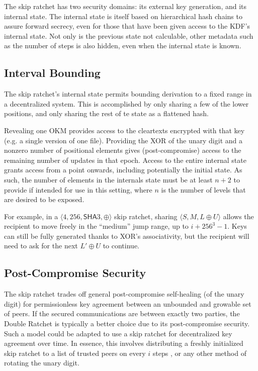 \documentclass[twocolumn]{article}
\begin{document}
	The skip ratchet has two security domains: its external key generation, and its internal state. The internal state is itself based on hierarchical hash chains to assure forward secrecy, even for those that have been given access to the KDF's internal state. Not only is the previous state not calculable, other metadata such as the number of steps is also hidden, even when the internal state is known.
	
	\subsection{Interval Bounding}
	
	The skip ratchet's internal state permits bounding derivation to a fixed range in a decentralized system. This is accomplished by only sharing a few of the lower positions, and only sharing the rest of te state as a flattened hash.
	
	Revealing one OKM provides access to the cleartexts encrypted with that key (e.g. a single version of one file). Providing the \textsf{XOR} of the unary digit and a nonzero number of positional elements gives (post-compromise) access to the remaining number of updates in that epoch. Access to the entire internal state grants access from a point onwards, including potentially the initial state. As such, the number of elements in the internals state must be at least $n+2$ to provide if intended for use in this setting, where $n$ is the number of levels that are desired to be exposed.
	
	For example, in a $\langle 4, 256, \textsf{SHA}3, \oplus \rangle$ skip ratchet, sharing $\langle S, M, L \oplus U \rangle$ allows the recipient to move freely in the ``medium'' jump range, up to $i + 256^{3} - 1$. Keys can still be fully generated thanks to \textsf{XOR}'s associativity, but the recipient will need to ask for the next $L' \oplus U$ to continue.
	
	\subsection{Post-Compromise Security}
	
	The skip ratchet trades off general post-compromise self-healing (of the unary digit) for permissionless key agreement between an unbounded and growable set of peers. If the secured communications are between exactly two parties, the Double Ratchet is typically a better choice due to its post-compromise security. Such a model could be adapted to use a skip ratchet for decentralized key agreement over time. In essence, this involves distributing a freshly initialized skip ratchet to a list of trusted peers on every $i$ steps \cite{decentralized-key-agreement}, or any other method of rotating the unary digit.
	
\end{document}
